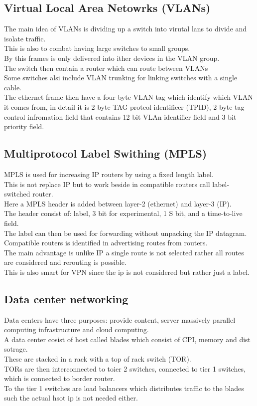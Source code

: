 \documentclass[12pt, a4paper]{article}
\begin{document}
		\subsection{Virtual Local Area Netowrks (VLANs)}
			The main idea of VLANs is dividing up a switch into virutal lans to divide and isolate traffic.\\
			This is also to combat having large switches to small groups.\\
			By this frames is only delivered into ither devices in the VLAN group.\\
			The switch then contain a router which can route between VLANs\\
			Some switches alsi include VLAN trunking for linking switches with a single cable.\\
			The ethernet frame then have a four byte VLAN tag which identify which VLAN it comes from, in detail it is 2 byte TAG protcol identificer (TPID), 2 byte tag control infromation field that contains 12 bit VLAn identifier field and 3 bit priority field.\\
		\subsection{Multiprotocol Label Swithing (MPLS)}
			MPLS is used for increasing IP routers by using a fixed length label.\\
			This is not replace IP but to work beside in compatible routers call label-switched router.\\
			Here a MPLS header is added between layer-2 (ethernet) and layer-3 (IP).\\
			The header consist of: label, 3 bit for experimental, 1 S bit, and a time-to-live field.\\
			The label can then be used for forwarding without unpacking the IP datagram.\\
			Compatible routers is identified in advertising routes from routers.\\
			The main advantage is unlike IP a single route is not selected rather all routes are considered and rerouting is possible.\\
			This is also smart for VPN since the ip is not considered but rather just a label.
		\subsection{Data center networking}
			Data centers have three purposes: provide content, server massively parallel computing infrastructure and cloud computing.\\
			A data center cosist of host called blades which consist of CPI, memory and dist sotrage.\\
			These are stacked in a rack with a top of rack switch (TOR). \\
			TORs are then interconnected to toier 2 switches, connected to tier 1 switches, which is connected to border router.\\
			To the tier 1 switches are load balancers which distributes traffic to the blades such the actual hsot ip is not needed either.
\end{document}
